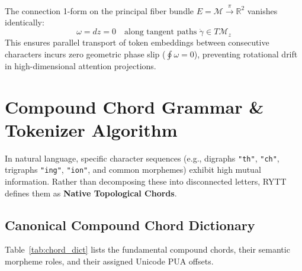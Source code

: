 \documentclass[11pt,oneside,letterpaper]{article}
\theoremstyle{definition}
\begin{document}
The connection 1-form on the principal fiber bundle $E = \mathcal{M} \xrightarrow{\pi} \mathbb{R}^2$ vanishes identically:
\begin{equation}
\omega = dz = 0 \quad \text{along tangent paths } \dot{\gamma} \in T\mathcal{M}_z
\end{equation}
This ensures parallel transport of token embeddings between consecutive characters incurs zero geometric phase slip ($\oint \omega = 0$), preventing rotational drift in high-dimensional attention projections.

\section{Compound Chord Grammar \& Tokenizer Algorithm}

In natural language, specific character sequences (e.g., digraphs \texttt{"th"}, \texttt{"ch"}, trigraphs \texttt{"ing"}, \texttt{"ion"}, and common morphemes) exhibit high mutual information. Rather than decomposing these into disconnected letters, RYTT defines them as \textbf{Native Topological Chords}.

\subsection{Canonical Compound Chord Dictionary}
Table~\ref{tab:chord_dict} lists the fundamental compound chords, their semantic morpheme roles, and their assigned Unicode PUA offsets.
\end{document}
